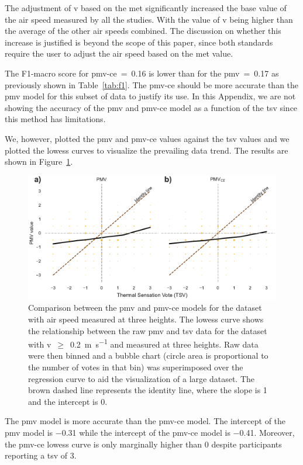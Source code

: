 The adjustment of \ac{v} based on the \ac{met} significantly increased the base value of the air speed measured by all the studies.
With the value of \ac{v} being  higher than the average of the other air speeds combined.
The discussion on whether this increase is justified is beyond the scope of this paper, since both standards require the user to adjust the air speed based on the \ac{met} value.

The F1-macro score for \ac{pmv-ce}~=~\num{.16} is lower than for the \ac{pmv}~=~\num{.17} as previously shown in Table~\ref{tab:f1}.
The \ac{pmv-ce} should be more accurate than the \ac{pmv} model for this subset of data to justify its use.
In this Appendix, we are not showing the accuracy of the \ac{pmv} and \ac{pmv-ce} model as a function of the \ac{tsv} since this method has limitations.

We, however, plotted the \ac{pmv} and \ac{pmv-ce} values against the \ac{tsv} values and we plotted the \ac{lowess} curves to visualize the prevailing data trend.
The results are shown in Figure~\ref{fig:bubble_models_vs_tsv_three_heights}.
\begin{figure}[htb!]
    \centering
    \includegraphics[width=\textwidth]{figures/bubble_models_vs_tsv_three_heights}
    \caption{Comparison between the \ac{pmv} and \ac{pmv-ce} models for the dataset with air speed measured at three heights. 
    The \ac{lowess} curve shows the relationship between the raw \ac{pmv} and \ac{tsv} data for the dataset with \ac{v}~$\geq$~\qty{0.2}{\m\per\s} and measured at three heights.
    Raw data were then binned and a bubble chart (circle area is proportional to the number of votes in that bin) was superimposed over the regression curve to aid the visualization of a large dataset.
    The brown dashed line represents the identity line, where the slope is 1 and the intercept is 0.}
    \label{fig:bubble_models_vs_tsv_three_heights}
\end{figure}
The \ac{pmv} model is more accurate than the \ac{pmv-ce} model.
The intercept of the \ac{pmv} model is \num{-.31} while the intercept of the \ac{pmv-ce} model is \num{-.41}.
Moreover, the \ac{pmv-ce} \ac{lowess} curve is only marginally higher than \num{0} despite participants reporting a \ac{tsv} of \num{3}.

